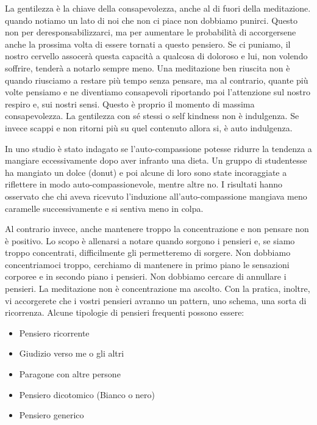 \documentclass[12pt]{book} %
\begin{document}
La gentilezza è la chiave della consapevolezza, anche al di fuori della meditazione. quando notiamo un lato di
noi che non ci piace non dobbiamo punirci. Questo non per deresponsabilizzarci, ma per aumentare le probabilità di
accorgersene anche la prossima volta di essere tornati a questo pensiero. Se ci puniamo, il nostro cervello assocerà questa capacità a qualcosa di doloroso
e lui, non volendo soffrire, tenderà a notarlo sempre meno. Una meditazione ben riuscita non è quando riusciamo a restare più tempo
senza pensare, ma al contrario, quante più volte pensiamo e ne diventiamo consapevoli riportando poi
l'attenzione sul nostro respiro e, sui nostri sensi. Questo è proprio il momento di massima
consapevolezza. 
La gentilezza con sé stessi o self kindness non è indulgenza. Se invece scappi e non ritorni più su quel contenuto allora si, è auto indulgenza.

\begin{mdframed}[linewidth=1pt]
In uno studio è stato indagato se l’auto-compassione potesse ridurre la tendenza a mangiare eccessivamente dopo aver infranto una dieta. Un gruppo di studentesse ha mangiato un dolce (donut) e poi alcune di loro sono state incoraggiate a riflettere in modo auto-compassionevole, mentre altre no. I risultati hanno osservato che chi aveva ricevuto l’induzione all’auto-compassione mangiava meno caramelle successivamente e si sentiva meno in colpa.
\end{mdframed}

Al contrario invece, anche mantenere troppo la concentrazione e non pensare non è positivo. Lo scopo è allenarsi a notare quando sorgono i pensieri e, se siamo troppo concentrati, difficilmente gli permetteremo di sorgere. 
Non dobbiamo concentriamoci troppo, cerchiamo di mantenere in primo piano le sensazioni corporee e in secondo piano i pensieri. 
Non dobbiamo cercare di annullare i pensieri.
La meditazione non è concentrazione ma ascolto.
Con la pratica, inoltre, vi accorgerete che i vostri pensieri avranno un pattern, uno schema, una sorta di ricorrenza. 
Alcune tipologie di pensieri frequenti possono essere:
\begin{itemize}
\item Pensiero ricorrente
\item Giudizio verso me o gli altri
\item Paragone con altre persone
\item Pensiero dicotomico (Bianco o nero)
\item Pensiero generico
\end{itemize}
\end{document}

